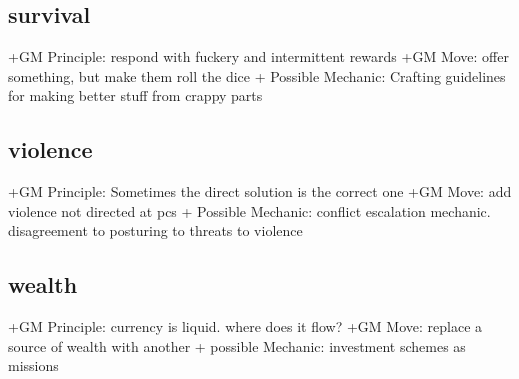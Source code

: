 \documentclass{tufte-handout}
\begin{document}
\begin{multicols}{2}
\subsection{survival}
+GM Principle: respond with fuckery and intermittent rewards
+GM Move:  offer something, but make them roll the dice
+ Possible Mechanic: Crafting guidelines for making better stuff from crappy parts

\subsection{violence}
+GM Principle: Sometimes the direct solution is the correct one
+GM Move: 	add violence not directed at pcs
+ Possible Mechanic: conflict escalation mechanic. disagreement to posturing to threats to violence 

\subsection{wealth}
+GM Principle: currency is liquid. where does it flow?
+GM Move: replace a source of wealth with another	
+ possible Mechanic: investment schemes as missions 

\end{multicols}

\newpage







\end{document}
